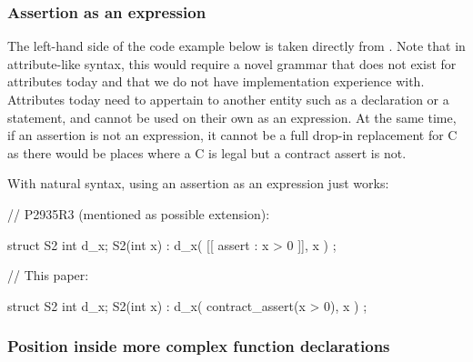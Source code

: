 

\subsubsection{Assertion as an expression}

The left-hand side of the code example below is taken directly from \cite{P2935R3}. Note that in attribute-like syntax, this would require a novel grammar that does not exist for attributes today and that we do not have implementation experience with. Attributes today need to appertain to another entity such as a declaration or a statement, and cannot be used on their own as an expression. At the same time, if an assertion is not an expression, it cannot be a full drop-in replacement for C  as there would be places where a C  is legal but a contract assert is not.

With natural syntax, using an assertion as an expression just works:

\begin{minipage}{8cm}
\begin{codeblock}
// P2935R3 (mentioned as possible extension):

struct S2 {
  int d_x;
  S2(int x)
    : d_x( [[ assert : x > 0 ]], x )
  {}
};
\end{codeblock}
\end{minipage}
\begin{minipage}{8cm}
\begin{codeblock}
// This paper:

struct S2 {
  int d_x;
  S2(int x)
    : d_x( contract_assert(x > 0), x )
  {}
};
\end{codeblock}
\end{minipage}

\subsubsection{Position inside more complex function declarations}

